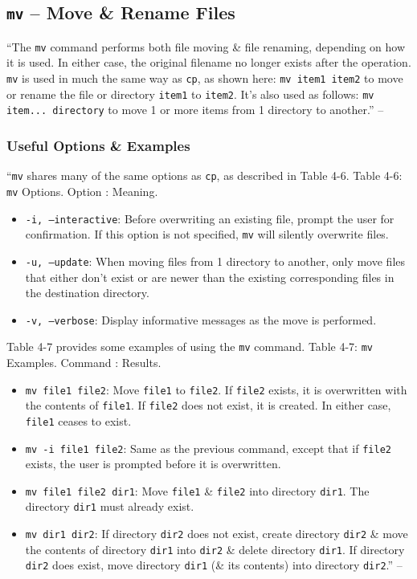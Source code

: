 \documentclass[oneside]{book}
\numberwithin{equation}{section}
\begin{document}
\subsection{\texttt{mv} -- Move \& Rename Files}
``The \texttt{mv} command performs both file moving \& file renaming, depending on how it is used. In either case, the original filename no longer exists after the operation. \texttt{mv} is used in much the same way as \texttt{cp}, as shown here: \texttt{mv item1 item2} to move or rename the file or directory \texttt{item1} to \texttt{item2}. It's also used as follows: \texttt{mv item... directory} to move 1 or more items from 1 directory to another.'' -- \cite[p. 70]{Shotts2019}

\subsubsection{Useful Options \& Examples}
``\texttt{mv} shares many of the same options as \texttt{cp}, as described in Table 4-6. \textsf{Table 4-6: \texttt{mv} Options. Option : Meaning.}
\begin{itemize}
	\item \texttt{-i, --interactive}: Before overwriting an existing file, prompt the user for confirmation. If this option is not specified, \texttt{mv} will silently overwrite files.
	\item \texttt{-u, --update}: When moving files from 1 directory to another, only move files that either don't exist or are newer than the existing corresponding files in the destination directory.
	\item \texttt{-v, --verbose}: Display informative messages as the move is performed.
\end{itemize}
Table 4-7 provides some examples of using the \texttt{mv} command. \textsf{Table 4-7: \texttt{mv} Examples. Command : Results.}
\begin{itemize}
	\item \texttt{mv file1 file2}: Move \texttt{file1} to \texttt{file2}. If \texttt{file2} exists, it is overwritten with the contents of \texttt{file1}. If \texttt{file2} does not exist, it is created. In either case, \texttt{file1} ceases to exist.
	\item \texttt{mv -i file1 file2}: Same as the previous command, except that if \texttt{file2} exists, the user is prompted before it is overwritten.
	\item \texttt{mv file1 file2 dir1}: Move \texttt{file1} \& \texttt{file2} into directory \texttt{dir1}. The directory \texttt{dir1} must already exist.
	\item \texttt{mv dir1 dir2}: If directory \texttt{dir2} does not exist, create directory \texttt{dir2} \& move the contents of directory \texttt{dir1} into \texttt{dir2} \& delete directory \texttt{dir1}. If directory \texttt{dir2} does exist, move directory \texttt{dir1} (\& its contents) into directory \texttt{dir2}.'' -- \cite[pp. 70--71]{Shotts2019}
\end{itemize}
\end{document}
